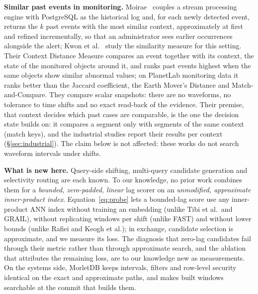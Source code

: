 \documentclass[sigconf]{acmart}
\newcommand{\M}{MorletDB}
\begin{document}
\textbf{Similar past events in monitoring.} Moirae~\cite{moirae} couples a stream processing engine with PostgreSQL as the historical log and, for each newly detected event, returns the $k$ past events with the most similar context, approximately at first and refined incrementally, so that an administrator sees earlier occurrences alongside the alert; Kwon et al.~\cite{kwon} study the similarity measure for this setting. Their Context Distance Measure compares an event together with its context, the state of the monitored objects around it, and ranks past events highest when the same objects show similar abnormal values; on PlanetLab monitoring data it ranks better than the Jaccard coefficient, the Earth Mover's Distance and Match-and-Compare. They compare scalar snapshots: there are no waveforms, no tolerance to time shifts and no exact read-back of the evidence. Their premise, that context decides which past cases are comparable, is the one the decision state builds on: it compares a segment only with segments of the same context (match keys), and the industrial studies report their results per context (\S\ref{sec:industrial}). The claim below is not affected: these works do not search waveform intervals under shifts.

\textbf{What is new here.} Query-side shifting, multi-query candidate generation and selectivity routing are each known. To our knowledge, no prior work combines them for a \emph{bounded, zero-padded, linear} lag scorer on an \emph{unmodified, approximate inner-product index}. Equation~\ref{eq:probe} lets a bounded-lag score use any inner-product ANN index without training an embedding (unlike Tibi et al.\ and GRAIL), without replicating windows per shift (unlike FAST) and without lower bounds (unlike Rafiei and Keogh et al.); in exchange, candidate selection is approximate, and we measure its loss. The diagnosis that zero-lag candidates fail through their metric rather than through approximate search, and the ablation that attributes the remaining loss, are to our knowledge new as measurements. On the systems side, \M{} keeps intervals, filters and row-level security identical on the exact and approximate paths, and makes built windows searchable at the commit that builds them.
\end{document}
